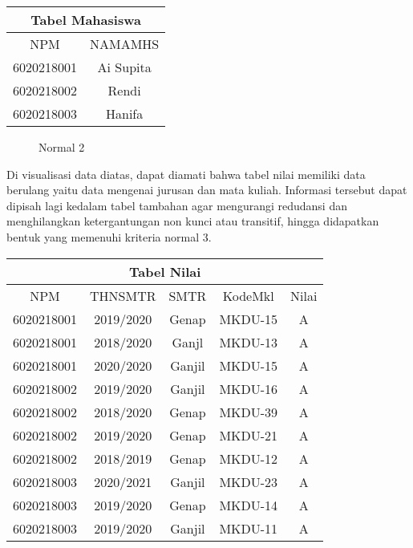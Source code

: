 \documentclass[12pt,a4paper]{article}
\begin{document}
\begin{multicols}{3}
  \columnbreak

  \begin{adjustbox}{scale=0.6,center}
    \begin{tabular}{ |c|c| } 
      \hline \multicolumn{2}{|c|}{Tabel Mahasiswa} \\ \hline
      NPM        & NAMAMHS   \\ \hline \hline
      6020218001 & Ai Supita \\ \hline
      6020218002 & Rendi     \\ \hline
      6020218003 & Hanifa    \\ \hline
    \end{tabular}
  \end{adjustbox}

\end{multicols}

\begin{figure}[h]
  \centering
  \caption{\small{Normal 2}}
\end{figure}

Di visualisasi data diatas, dapat diamati bahwa tabel nilai memiliki data
berulang yaitu data mengenai jurusan dan mata kuliah. Informasi tersebut
dapat dipisah lagi kedalam tabel tambahan agar mengurangi redudansi dan
menghilangkan ketergantungan non kunci atau transitif, hingga didapatkan
bentuk yang memenuhi kriteria normal 3.

\vspace{1cm}

\begin{adjustbox}{scale=0.5,center}
  \begin{tabular}{ |c|c|c|c|c| } 
    \hline
    \multicolumn{5}{|c|}{Tabel Nilai} \\ \hline
    NPM        & THNSMTR   & SMTR    &  KodeMkl & Nilai \\ \hline \hline
    6020218001 & 2019/2020 & Genap   &  MKDU-15 & A     \\ \hline
    6020218001 & 2018/2020 & Ganjl   &  MKDU-13 & A     \\ \hline
    6020218001 & 2020/2020 & Ganjil  &  MKDU-15 & A     \\ \hline
    6020218002 & 2019/2020 & Ganjil  &  MKDU-16 & A     \\ \hline
    6020218002 & 2018/2020 & Genap   &  MKDU-39 & A     \\ \hline
    6020218002 & 2019/2020 & Genap   &  MKDU-21 & A     \\ \hline
    6020218002 & 2018/2019 & Genap   &  MKDU-12 & A     \\ \hline
    6020218003 & 2020/2021 & Ganjil  &  MKDU-23 & A     \\ \hline
    6020218003 & 2019/2020 & Genap   &  MKDU-14 & A     \\ \hline
    6020218003 & 2019/2020 & Ganjil  &  MKDU-11 & A     \\ 
    \hline
  \end{tabular}
\end{adjustbox}
\end{document}
